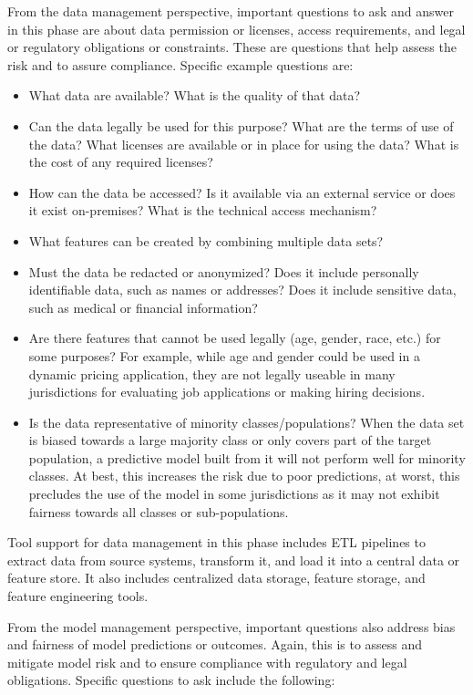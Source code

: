 From the data management perspective, important questions to ask and answer in this phase are about data permission or licenses, access requirements, and legal or regulatory obligations or constraints. These are questions that help assess the risk and to assure compliance. Specific example questions are:

\begin{itemize}
   \item What data are available? What is the quality of that data?
   \item Can the data legally be used for this purpose? What are the terms of use of the data? What licenses are available or in place for using the data? What is the cost of any required licenses?
   \item How can the data be accessed? Is it available via an external service or does it exist on-premises? What is the technical access mechanism?
   \item What features can be created by combining multiple data sets?
   \item Must the data be redacted or anonymized? Does it include personally identifiable data, such as names or addresses? Does it include sensitive data, such as medical or financial information?
   \item Are there features that cannot be used legally (age, gender, race, etc.) for some purposes? For example, while age and gender could be used in a dynamic pricing application, they are not legally useable in many jurisdictions for evaluating job applications or making hiring decisions. 
   \item Is the data representative of minority classes/populations? When the data set is biased towards a large majority class or only covers part of the target population, a predictive model built from it will not perform well for minority classes. At best, this increases the risk due to poor predictions, at worst, this precludes the use of the model in some jurisdictions as it may not exhibit fairness towards all classes or sub-populations.
\end{itemize}

Tool support for data management in this phase includes ETL pipelines to extract data from source systems, transform it, and load it into a central data or feature store. It also includes centralized data storage, feature storage, and feature engineering tools. 

From the model management perspective, important questions also address bias and fairness of model predictions or outcomes. Again, this is to assess and mitigate model risk and to ensure compliance with regulatory and legal obligations. Specific questions to ask include the following:

